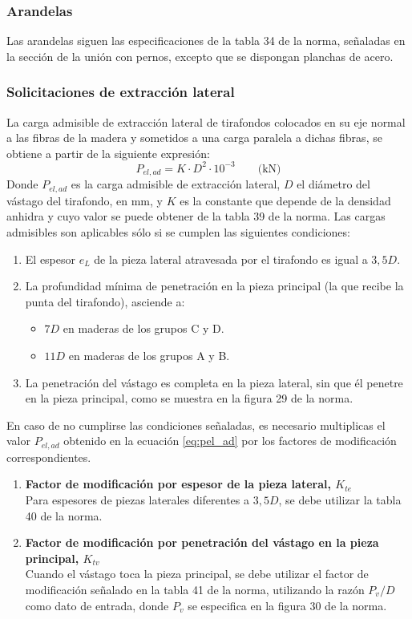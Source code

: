 \subsubsection{Arandelas}
Las arandelas siguen las especificaciones de la tabla 34 de la norma, señaladas en la sección de la unión con pernos, excepto que se dispongan planchas de acero.

\subsubsection{Solicitaciones de extracción lateral}
La carga admisible de extracción lateral de tirafondos colocados en su eje normal a las fibras de la madera y sometidos a una carga paralela a dichas fibras, se obtiene a partir de la siguiente expresión:
\begin{equation}\label{eq:pel_ad}
	P_{el,ad}=K\cdot D^2 \cdot 10^{-3} \qquad \text{(kN)}
\end{equation}
Donde $P_{el,ad}$ es la carga admisible de extracción lateral, $D$ el diámetro del vástago del tirafondo, en mm, y $K$ es la constante que depende de la densidad anhidra y cuyo valor se puede obtener de la tabla 39 de la norma.
Las cargas admisibles son aplicables sólo si se cumplen las siguientes condiciones:
\begin{enumerate}
	\item El espesor $e_L$ de la pieza lateral atravesada por el tirafondo es igual a $3,5D$.
	\item La profundidad mínima de penetración en la pieza principal (la que recibe la punta del tirafondo), asciende a:
	\begin{itemize}
		\item $7D$ en maderas de los grupos C y D.
		\item $11D$ en maderas de los grupos A y B.
	\end{itemize}
	\item La penetración del vástago es completa en la pieza lateral, sin que él penetre en la pieza principal, como se muestra en la figura 29 de la norma. 
\end{enumerate}

En caso de no cumplirse las condiciones señaladas, es necesario multiplicas el valor $P_{el,ad}$ obtenido en la ecuación \ref{eq:pel_ad} por los factores de modificación correspondientes.
\begin{enumerate}
	\item \textbf{Factor de modificación por espesor de la pieza lateral, $K_{te}$}\\
	Para espesores de piezas laterales diferentes a $3,5D$, se debe utilizar la tabla 40 de la norma.
	\item \textbf{Factor de modificación por penetración del vástago en la pieza principal, $K_{tv}$}\\
	Cuando el vástago toca la pieza principal, se debe utilizar el factor de modificación señalado en la tabla 41 de la norma, utilizando la razón $P_v / D$ como dato de entrada, donde $P_v$ se especifica en la figura 30 de la norma.	
\end{enumerate}

